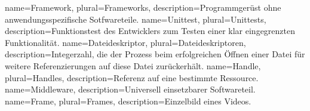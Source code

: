 \makeglossaries 

{
	name={Framework},  
	plural={Frameworks},
	description={Programmgerüst ohne anwendungsspezifische Sotfwareteile. \citep[S. 847]{gumm2011einfuhrung}}
}  
{
	name={Unittest},  
	plural={Unittests},
	description={Funktionstest des Entwicklers zum Testen einer klar eingegrenzten Funktionalität. \citep[S. 3]{hunt2004unit}}
}  
{
	name={Dateideskriptor},  
	plural={Dateideskriptoren},
	description={Integerzahl, die der Prozess beim erfolgreichen Öffnen einer Datei für weitere Referenzierungen auf diese Datei zurückerhält. \citep[S. 25]{beck1994linux}}
}  
{
	name={Handle},  
	plural={Handles},
	description={Referenz auf eine bestimmte Ressource.}
} 
{
	name={Middleware},  
	description={Universell einsetzbarer Softwareteil. \citep[S. 487]{sommerville2011software}}
} 
{
	name={Frame},
	plural={Frames},  
	description={Einzelbild eines Videos.}
} 